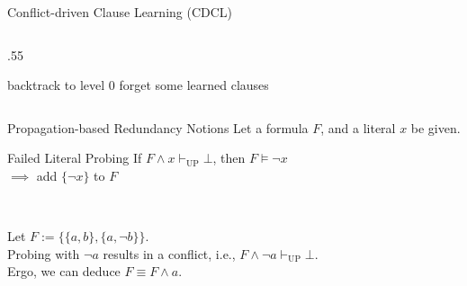\documentclass[t]{sdqbeamer}
\begin{document}
\begin{frame}{Conflict-driven Clause Learning (CDCL)}
\begin{columns}[T]
\begin{column}{.55\linewidth}
\begin{algorithm}[H]
     {
        \Return \UNSAT
    }
    \BlankLine
     {
        \propagation\;
         {
             {
                \Return \UNSAT
            }
        }
        \lIf {\restart} {
            backtrack to level $0$
        }
        \lIf {\cleanup} {
            forget some learned clauses
        }
         {
            \Return \UNSAT
        }
        \branching\;
    }
    \Return \SAT\;
\end{algorithm}
\end{column}
\end{columns}
\end{frame}


\begin{frame}{Propagation-based Redundancy Notions}
Let a formula $F$, and a literal $x$ be given.\\[1ex]
\begin{block}{Failed Literal Probing}
If $F \land x \vdash_{\mathop{UP}} \bot$, then $F \models \lnot x$\\[1ex]
$\implies$ add $\{ \lnot x \}$ to $F$
\end{block}~\\
\begin{example}
Let $F := \bigl\{ \{a, b\}, \{a, \lnot b\} \bigr\}$.\\[1ex]
Probing with $\lnot a$ results in a conflict, i.e., $F \land \lnot a \vdash_{\mathop{UP}} \bot$.\\[1ex]
Ergo, we can deduce $F \equiv F \land a$.
\end{example}
\end{frame}
    
\end{document}

